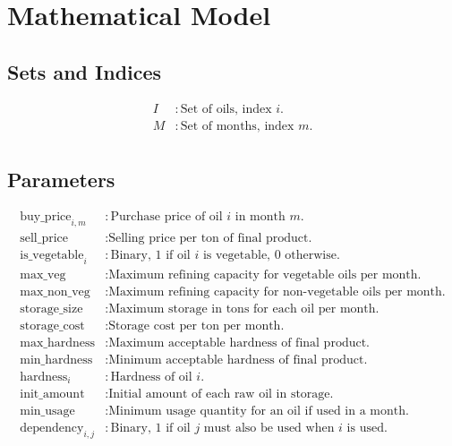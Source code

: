 \documentclass{article}
\begin{document}
\section*{Mathematical Model}

\subsection*{Sets and Indices}
\begin{align*}
I & : \text{Set of oils, index } i. \\
M & : \text{Set of months, index } m. \\
\end{align*}

\subsection*{Parameters}
\begin{align*}
\text{buy\_price}_{i, m} & : \text{Purchase price of oil } i \text{ in month } m. \\
\text{sell\_price} & : \text{Selling price per ton of final product.} \\
\text{is\_vegetable}_{i} & : \text{Binary, 1 if oil } i \text{ is vegetable, 0 otherwise.} \\
\text{max\_veg} & : \text{Maximum refining capacity for vegetable oils per month.} \\
\text{max\_non\_veg} & : \text{Maximum refining capacity for non-vegetable oils per month.} \\
\text{storage\_size} & : \text{Maximum storage in tons for each oil per month.} \\
\text{storage\_cost} & : \text{Storage cost per ton per month.} \\
\text{max\_hardness} & : \text{Maximum acceptable hardness of final product.} \\
\text{min\_hardness} & : \text{Minimum acceptable hardness of final product.} \\
\text{hardness}_{i} & : \text{Hardness of oil } i. \\
\text{init\_amount} & : \text{Initial amount of each raw oil in storage.} \\
\text{min\_usage} & : \text{Minimum usage quantity for an oil if used in a month.} \\
\text{dependency}_{i, j} & : \text{Binary, 1 if oil } j \text{ must also be used when } i \text{ is used.} \\
\end{align*}
\end{document}
